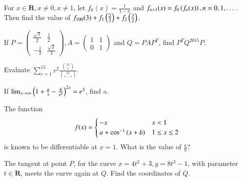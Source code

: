 \documentclass[journal,12pt,onecolumn]{IEEEtran}
\begin{document}
\begin{problem}
For $x \in \mathbf{R}, x \neq 0, x \neq 1$, let $f_0(x) = \frac{1}{1-x}$ 
and $f_{n+1}(x) = f_0\left(f_n(x)\right), n = 0, 1, \dots $.  Then find the value of
$f_{100}(3) + f_1\left(\frac{2}{3}\right)+f_2\left(\frac{3}{2}\right)$.
\end{problem}
%
\begin{problem}
If $P = 
\begin{pmatrix}
\frac{\sqrt{3}}{2} & \frac{1}{2} \\
-\frac{1}{2} & \frac{\sqrt{3}}{2}
\end{pmatrix}, A = 
\begin{pmatrix}
1 & 1 \\
0 & 1
\end{pmatrix}
$ and $Q = P A P^{T}$, find $P^{T}Q^{2015} P$.
\end{problem}
\begin{problem}
Evaluate $\sum_{r=1}^{15}r^2 \frac{\binom{15}{r}}{\binom{15}{r-1}}$.
\end{problem}
\begin{problem}
If $\lim_{x \rightarrow \infty} \left(1 + \frac{a}{x} - \frac{4}{x^2}\right)^{2x} = e^3$, find a.
\end{problem}
\begin{problem}
The function
%
\begin{equation}
f(x)=
\begin{cases}
-x & x < 1 \\
a + \cos^{-1}\left(x + b\right) & 1 \leq x \leq 2
\end{cases}
\end{equation}
%
is known to be differentiable at $x=1$.  What is the value of $\frac{a}{b}$?
\end{problem}
\begin{problem}
The tangent at point $P$, for the curve $x = 4t^2+3, y = 8t^3-1$, with parameter $t \in \mathbf{R}$, meets the curve again at $Q$.  Find the coordinates of $Q$.
\end{problem}
\end{document}
